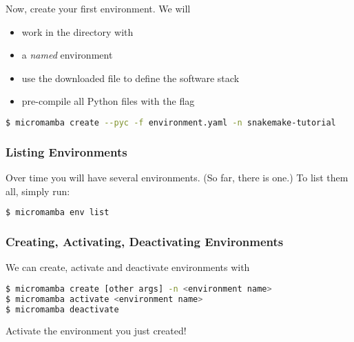 \begin{frame}[fragile]
  \frametitle{}
  Now, create your first environment. We will
  \begin{itemize}
  	\item work in the  directory with
  	\item a \textit{named} environment
  	\item use the downloaded  file to define the software stack
  	\item pre-compile all Python files with the  flag
  \end{itemize}
  \begin{lstlisting}[language=Bash, style=Shell,breaklines=true]
$ micromamba create --pyc -f environment.yaml -n snakemake-tutorial
  \end{lstlisting}	
\end{frame}

\begin{frame}[fragile]
  \frametitle{Listing Environments}
   Over time you will have several environments. (So far, there is one.) To list them all, simply run:
  \begin{lstlisting}[language=Bash, style=Shell]
$ micromamba env list
  \end{lstlisting}
\end{frame} 

\begin{frame}[fragile]
  \frametitle{Creating, Activating, Deactivating Environments}
  We can create, activate and deactivate environments with
  \begin{lstlisting}[language=Bash, style=Shell]
$ micromamba create [other args] -n <environment name>
$ micromamba activate <environment name>
$ micromamba deactivate
  \end{lstlisting}
   \begin{task}
   	  Activate the environment you just created!
   \end{task}
\end{frame}

